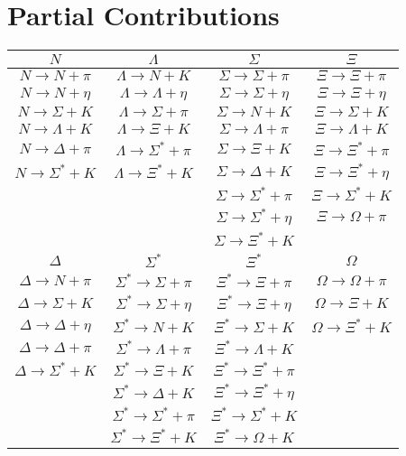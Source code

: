 \documentclass[10pt,a4paper]{article}
\begin{document}
\section{Partial Contributions}
\begin{table}[h]
\begin{tabular}{cccc}
\hline  \hline$N$	& $\Lambda$  & $\Sigma$ & $\Xi$ \\ 
\hline 	\hline $N \rightarrow N + \pi $  & $ \Lambda \rightarrow N + K  $ & $ \Sigma \rightarrow \Sigma + \pi  $ & $ \Xi \rightarrow \Xi + \pi  $ \\ 
	$N \rightarrow N + \eta $ & $ \Lambda \rightarrow \Lambda + \eta  $ & $ \Sigma \rightarrow \Sigma + \eta  $ & $ \Xi \rightarrow \Xi + \eta  $ \\ 
	$ N \rightarrow \Sigma + K $ & $ \Lambda \rightarrow \Sigma + \pi $ & $ \Sigma \rightarrow N + K  $ &  $ \Xi \rightarrow \Sigma + K  $ \\ 
	$ N \rightarrow \Lambda + K $ & $ \Lambda \rightarrow \Xi + K  $ & $ \Sigma \rightarrow \Lambda + \pi  $ & $ \Xi \rightarrow \Lambda + K  $ \\ 
	$ N \rightarrow \Delta + \pi $ & $ \Lambda \rightarrow \Sigma^* + \pi  $ & $ \Sigma \rightarrow \Xi + K  $ &  $ \Xi \rightarrow \Xi^* + \pi  $\\ 
	$ N \rightarrow \Sigma^* + K  $ & $ \Lambda \rightarrow \Xi^* + K  $ & $ \Sigma \rightarrow \Delta + K  $ & $ \Xi \rightarrow \Xi^* + \eta  $ \\ 
	&  & $ \Sigma \rightarrow \Sigma^* + \pi  $ & $ \Xi \rightarrow \Sigma^* + K  $ \\ 
	&  & $ \Sigma \rightarrow \Sigma^* + \eta  $ & $ \Xi \rightarrow \Omega + \pi  $ \\
	& & $ \Sigma \rightarrow \Xi^* + K  $ & \\
\hline \hline	$\Delta$ & $\Sigma^*$ & $\Xi^*$ & $\Omega$\\
\hline \hline  $\Delta \rightarrow N + \pi $ & $\Sigma^* \rightarrow \Sigma + \pi $ & $\Xi^* \rightarrow \Xi + \pi $ & $\Omega \rightarrow \Omega + \pi $ \\
$\Delta \rightarrow \Sigma + K $ & $\Sigma^* \rightarrow \Sigma + \eta $ & $\Xi^* \rightarrow \Xi + \eta $ & $\Omega \rightarrow \Xi + K $ \\
$\Delta \rightarrow \Delta + \eta $ & $\Sigma^* \rightarrow N + K $ & $\Xi^* \rightarrow \Sigma + K $ & $\Omega \rightarrow \Xi^* + K $ \\
$\Delta \rightarrow \Delta + \pi $ & $\Sigma^* \rightarrow \Lambda + \pi $ & $\Xi^* \rightarrow \Lambda + K $ & \\
$\Delta \rightarrow \Sigma^* + K $ & $\Sigma^* \rightarrow \Xi + K $ & $\Xi^* \rightarrow \Xi^* + \pi $ & \\
& $\Sigma^* \rightarrow \Delta + K $ &$\Xi^* \rightarrow \Xi^* + \eta $ & \\
& $\Sigma^* \rightarrow \Sigma^* + \pi $ & $\Xi^* \rightarrow \Sigma^* + K $ & \\
& $\Sigma^* \rightarrow \Xi^* + K $ & $\Xi^* \rightarrow \Omega + K $ & \\
\hline \hline
\end{tabular} 
\end{table}
\end{document}
